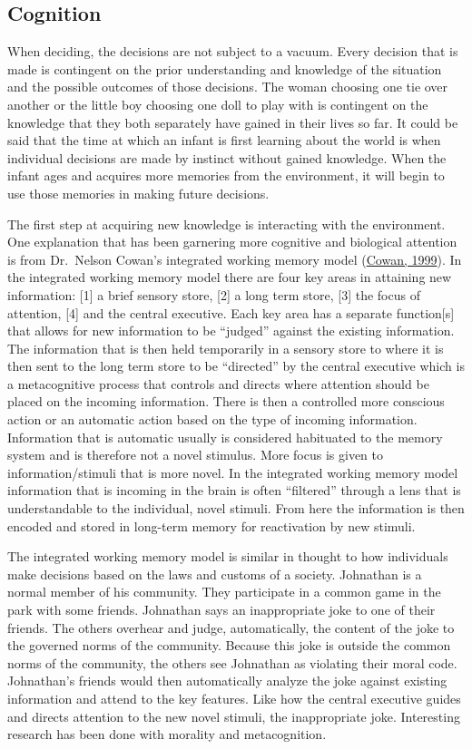 \documentclass[
  donotrepeattitle,doc, 12pt, a4paper,floatsintext]{apa7}
\begin{document}
\hypertarget{cognition}{%
\subsection{Cognition}\label{cognition}}

When deciding, the decisions are not subject to a vacuum. Every decision that is made is contingent on the prior understanding and knowledge of the situation and the possible outcomes of those decisions. The woman choosing one tie over another or the little boy choosing one doll to play with is contingent on the knowledge that they both separately have gained in their lives so far. It could be said that the time at which an infant is first learning about the world is when individual decisions are made by instinct without gained knowledge. When the infant ages and acquires more memories from the environment, it will begin to use those memories in making future decisions.

The first step at acquiring new knowledge is interacting with the environment. One explanation that has been garnering more cognitive and biological attention is from Dr.~Nelson Cowan's integrated working memory model (\protect\hyperlink{ref-cowan1999}{Cowan, 1999}). In the integrated working memory model there are four key areas in attaining new information: {[}1{]} a brief sensory store, {[}2{]} a long term store, {[}3{]} the focus of attention, {[}4{]} and the central executive. Each key area has a separate function{[}s{]} that allows for new information to be ``judged'' against the existing information. The information that is then held temporarily in a sensory store to where it is then sent to the long term store to be ``directed'' by the central executive which is a metacognitive process that controls and directs where attention should be placed on the incoming information. There is then a controlled more conscious action or an automatic action based on the type of incoming information. Information that is automatic usually is considered habituated to the memory system and is therefore not a novel stimulus. More focus is given to information/stimuli that is more novel. In the integrated working memory model information that is incoming in the brain is often ``filtered'' through a lens that is understandable to the individual, novel stimuli. From here the information is then encoded and stored in long-term memory for reactivation by new stimuli.

The integrated working memory model is similar in thought to how individuals make decisions based on the laws and customs of a society. Johnathan is a normal member of his community. They participate in a common game in the park with some friends. Johnathan says an inappropriate joke to one of their friends. The others overhear and judge, automatically, the content of the joke to the governed norms of the community. Because this joke is outside the common norms of the community, the others see Johnathan as violating their moral code. Johnathan's friends would then automatically analyze the joke against existing information and attend to the key features. Like how the central executive guides and directs attention to the new novel stimuli, the inappropriate joke. Interesting research has been done with morality and metacognition.
\end{document}
